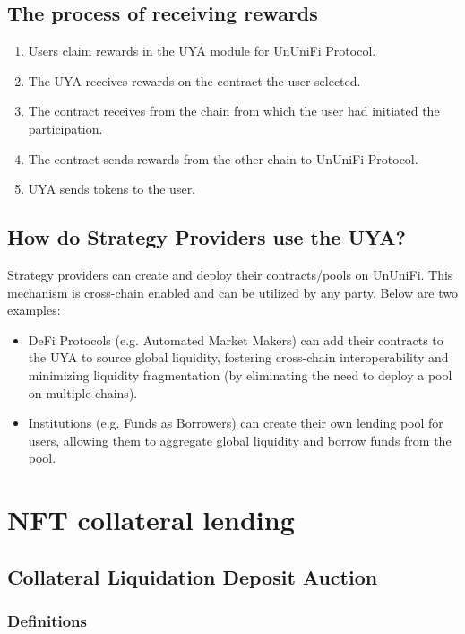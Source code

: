 \documentclass[dvipdfmx]{jsarticle}
\begin{document}
\subsection{The process of receiving rewards}
\begin{enumerate}
  \item Users claim rewards in the UYA module for UnUniFi Protocol.
  \item The UYA receives rewards on the contract the user selected.
  \item The contract receives from the chain from which the user had initiated the participation.
  \item The contract sends rewards from the other chain to UnUniFi Protocol.
  \item UYA sends tokens to the user.
\end{enumerate}


\subsection{How do Strategy Providers use the UYA?}
Strategy providers can create and deploy their contracts/pools on UnUniFi. This mechanism is cross-chain enabled and can be utilized by any party. Below are two examples:
\begin{itemize}
  \item DeFi Protocols (e.g. Automated Market Makers) can add their contracts to the UYA to source global liquidity, fostering cross-chain interoperability and minimizing liquidity fragmentation (by eliminating the need to deploy a pool on multiple chains).
  \item Institutions (e.g. Funds as Borrowers) can create their own lending pool for users, allowing them to aggregate global liquidity and borrow funds from the pool.
\end{itemize}


\section{NFT collateral lending}

\subsection{Collateral Liquidation Deposit Auction}

\subsubsection{Definitions}
\end{document}
